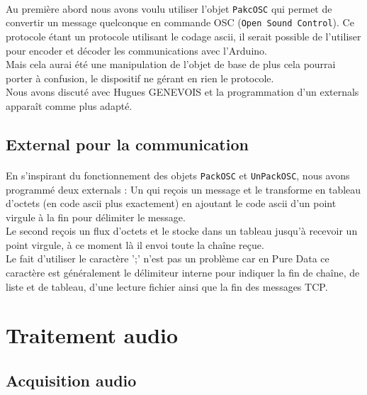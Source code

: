 \documentclass[a4paper, titlepage, oneside, 12pt]{article}%
\begin{document}
\paragraph{}
Au première abord nous avons voulu utiliser l'objet \texttt{PakcOSC} qui permet de convertir un message quelconque en commande OSC (\texttt{Open Sound Control}). Ce protocole étant un protocole utilisant le codage ascii, il serait possible de l'utiliser pour encoder et décoder les communications avec l'Arduino. \\
Mais cela aurai été une manipulation de l'objet de base de plus cela pourrai porter à confusion, le dispositif ne gérant en rien le protocole.\\
Nous avons discuté avec Hugues GENEVOIS et la programmation d'un externals apparaît comme plus adapté.

\subsection{External pour la communication}
\paragraph{}
En s'inspirant du fonctionnement des objets \texttt{PackOSC} et \texttt{UnPackOSC}, nous avons programmé deux externals : Un qui reçois un message et le transforme en tableau d’octets (en code ascii plus exactement) en ajoutant le code ascii d'un point virgule à la fin pour délimiter le message.\\
Le second reçois un flux d'octets et le stocke dans un tableau jusqu’à recevoir un point virgule, à ce moment là il envoi toute la chaîne reçue.\\
Le fait d'utiliser le caractère ';' n'est pas un problème car en Pure Data ce caractère est généralement le délimiteur interne pour indiquer la fin de chaîne, de liste et de tableau, d'une lecture fichier ainsi que la fin des messages TCP.

\section{Traitement audio}
\subsection{Acquisition audio}
\end{document}
